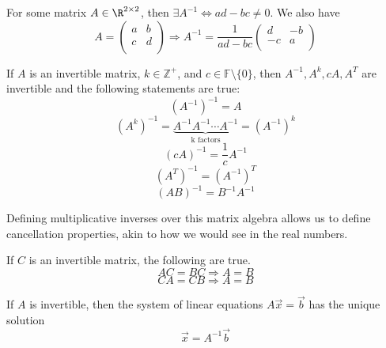 \begin{theorem}
    For some matrix \(A\in\R^{2\times 2}\), then \(\exists A^{-1}\Leftrightarrow ad-bc\neq 0 \). We also have
    \[
        A=\begin{pmatrix}
            a &b   \\
           c  & d  \\
        \end{pmatrix}\Longrightarrow A^{-1} =\frac{1}{ad-bc}\begin{pmatrix}
            d &-b   \\
             -c&a   \\
        \end{pmatrix}
    \]
\end{theorem}
\begin{theorem}
    If \(A\) is an invertible matrix, \(k\in\mathbb{Z} ^+\), and \(c\in\mathbb{F} \setminus \{ 0 \} \), then \(A^{-1},A^k ,cA,A^T \) are invertible and the following statements are true:
    \[
        (A^{-1} )^{-1} =A
    \]
    \[
        (A^k)^{-1} =\underbrace{A^{-1} A^{-1} \cdots A^{-1} }_\text{k factors}=(A^{-1} )^k
    \]
    \[
        (cA)^{-1} =\frac{1}{c}A^{-1} 
    \]
    \[
        (A^T)^{-1} =(A^{-1} )^T
    \]
    \[
        (AB)^{-1}=B^{-1} A^{-1} 
    \]
\end{theorem}
Defining multiplicative inverses over this matrix algebra allows us to define cancellation properties, akin to how we would see in the real numbers. 
\begin{theorem}
    If \(C\) is an invertible matrix, the following are true. 
    \[
        AC=BC\Longrightarrow A=B
    \]
    \[
        CA=CB\Longrightarrow A=B
    \]
\end{theorem}
\begin{theorem}
    If \(A\) is invertible, then the system of linear equations \(A\vec{x}=\vec{b}\) has the unique solution
    \[
        \vec{x}=A^{-1} \vec{b}
    \]
\end{theorem}
